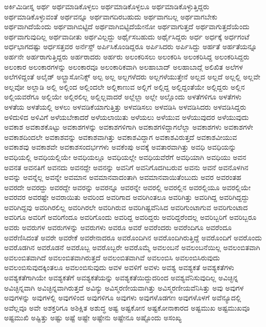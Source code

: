{ಅರ್ಕಿಮಿಡೀಸ್ನ
ಅರ್ಥ
ಅರ್ಥಮಾಡಿಕೊಳ್ಳಲು
ಅರ್ಥಮಾಡಿಕೊಳ್ಳಲೂ
ಅರ್ಥಮಾಡಿಕೊಳ್ಳುತ್ತಿದ್ದರು
ಅರ್ಥಮಾಡಿಕೊಳ್ಳುವಂತೆ
ಅರ್ಥವನ್ನೂ
ಅರ್ಥವಾಗದಿರಬಹುದು
ಅರ್ಥವಾಗಬಲ್ಲ
ಅರ್ಥವಾಗಬೇಕು
ಅರ್ಥವಾಗಿದೆಯೆಂದು
ಅರ್ಥವಾಗಿಬಿಟ್ಟಿದೆ
ಅರ್ಥವಾಗಿಬಿಟ್ಟಿದೆಯೇನೋ
ಅರ್ಥವಾಗುತ್ತದೆ
ಅರ್ಥವಾಗುತ್ತದೆಯೆಂದು
ಅರ್ಥವಾಗುವುದಿಲ್ಲ
ಅರ್ಥವಾದೀತು
ಅರ್ಥವಿಲ್ಲದ್ದು
ಅರ್ಥೈಸಬಹುದು
ಅರ್ಥೈಸಿದ್ದರು
ಅರ್ಧ
ಅರ್ಧಕ್ಕೆ
ಅರ್ಧಗಂಟೆ
ಅರ್ಧಭಾಗದಷ್ಟು
ಅರ್ಧಸತ್ತವರ
ಅರ್ನೆಸ್ಟ್
ಅರ್ಪಿಸಿಕೊಂಡಿದ್ದರೂ
ಅರ್ಪಿಸಿದರು
ಅರ್ಪಿಸಿದ್ದು
ಅರ್ಹತೆ
ಅರ್ಹತೆಯನ್ನೂ
ಅರ್ಹನೇ
ಅರ್ಹರಾಗುತ್ತಿದ್ದರು
ಅರ್ಹರಾದರು
ಅರ್ಹರು
ಅಲಂಕರಿಸಲು
ಅಲಂಕರಿಸಿ
ಅಲಂಕರಿಸಿದ್ದ
ಅಲಂಕರಿಸಿದ್ದರು
ಅಲಂಕಾರ
ಅಲಂಕಾರಗಳನ್ನು
ಅಲಂಕಾರವೂ
ಅಲಂಕಾರಿಕವಾಗಿ
ಅಲಹಾಬಾದ್
ಅಲಹಾಬಾದ್ಗೆ
ಅಲಿಖಿತ
ಅಲೆಗಳ
ಅಲೆಗಳಿದ್ದಂತೆ
ಅಲೈಡ್
ಅಲ್ಟ್ರಾಸೋನಿಕ್ಸ್
ಅಲ್ಪ
ಅಲ್ಲ
ಅಲ್ಲಗಳೆದರು
ಅಲ್ಲಗಳೆಯುತ್ತೇನೆ
ಅಲ್ಲದ
ಅಲ್ಲದೆ
ಅಲ್ಲಲ್ಲಿ
ಅಲ್ಲವೇ
ಅಲ್ಲವೋ
ಅಲ್ಲಾಡಿ
ಅಲ್ಲಿ
ಅಲ್ಲಿಂದ
ಅಲ್ಲಿಂದಲೇ
ಅಲ್ಲಿಕಾಣುವ
ಅಲ್ಲಿಗೆ
ಅಲ್ಲಿದ್ದ
ಅಲ್ಲಿದ್ದಂತೆಯೇ
ಅಲ್ಲಿದ್ದರು
ಅಲ್ಲಿನ
ಅಲ್ಲಿಯವರೆಗೂ
ಅಲ್ಲಿಯೇ
ಅಲ್ಲಿರಲಿಲ್ಲ
ಅಲ್ಲಿಲ್ಲವಾದರೆ
ಅಲ್ಲೆಲ್ಲಾ
ಅಲ್ಲೇ
ಅಲ್ಲೊಂದು
ಅಳತೆಗಳಿಗೂ
ಅಳತೆಗಳು
ಅಳತೆಯ
ಅಳತೆಯಲ್ಲಿ
ಅಳಲು
ಅಳವಡಿಕೆಯಾಗುತ್ತಿತ್ತು
ಅಳವಡಿಸಲು
ಅಳವಡಿಸಿ
ಅಳವಡಿಸಿದರು
ಅಳವಡಿಸಿದ್ದರು
ಅಳಿದುಳಿದ
ಅಳಿವಿಗೆ
ಅಳೆಯಬೇಕಾದರೆ
ಅಳೆಯಲಾಯಿತು
ಅಳೆಯಲು
ಅಳೆಯುವ
ಅಳೆಯುವುದರ
ಅಳೆಯುವುದು
ಅವಕಾಶ
ಅವಕಾಶಕೊಟ್ಟು
ಅವಕಾಶಗಳನ್ನು
ಅವಕಾಶಗಳಿಗಾಗಿ
ಅವಕಾಶಗಳಿದ್ದಾಗಲೆಲ್ಲಾ
ಅವಕಾಶಗಳು
ಅವಕಾಶಗಳೇ
ಅವಕಾಶದಿಂದಲೇ
ಅವಕಾಶವನ್ನು
ಅವಕಾಶವಾಗಿತ್ತು
ಅವಕಾಶವಿದ್ದಾಗ
ಅವಕಾಶವಿರುತ್ತದೆ
ಅವಕಾಶವೀಯುವ
ಅವಕಾಶವು
ಅವಕಾಶವೇ
ಅವಕಾಶಸಂದರ್ಭಗಳು
ಅವಕೆಂಪು
ಅವಕ್ಕೆ
ಅವತಾರವಾಗಿತ್ತು
ಅವಧಿ
ಅವಧಿಯನ್ನು
ಅವಧಿಯಲ್ಲಿ
ಅವಧಿಯಲ್ಲಿಯೇ
ಅವಧಿಯಲ್ಲೂ
ಅವಧಿಯಲ್ಲೇ
ಅವಧಿಯವೆರೆಗೆ
ಅವಧಿಯಾಗಿ
ಅವಧಿಯು
ಅವನ
ಅವನತ
ಅವನತಿಗೆ
ಅವನದು
ಅವನದ್ದೇ
ಅವನನ್ನು
ಅವನಿಗೆ
ಅವನಿಗೊದಗಿಬರುವ
ಅವನು
ಅವನೆ
ಅವನೊಳಗಿನ
ಅವನ್ನು
ಅವನ್ನೆಲ್ಲ
ಅವನ್ನೇ
ಅವಮಾನ
ಅವಮಾನವಾದಂತಾಗಿ
ಅವಮಾನವಾಯಿತೆಂಬುದು
ಅವರ
ಅವರಂತಹ
ಅವರದೇ
ಅವರದ್ದು
ಅವರದ್ದೇ
ಅವರನ್ನು
ಅವರನ್ನೂ
ಅವರನ್ನೇ
ಅವರಲ್ಲಿ
ಅವರಲ್ಲಿನ
ಅವರಲ್ಲಿಯೂ
ಅವರಲ್ಲಿಯೇ
ಅವರವರ
ಅವರಷ್ಟೇ
ಅವರಾಯಿತು
ಅವರಿಂದ
ಅವರಿಗಾದ
ಅವರಿಗಿಂತಲೂ
ಅವರಿಗಿತ್ತು
ಅವರಿಗಿದ್ದ
ಅವರಿಗಿದ್ದದ್ದು
ಅವರಿಗಿದ್ದವು
ಅವರಿಗಿರಲಿಲ್ಲ
ಅವರಿಗಿರಲೇ
ಅವರಿಗಿರುವ
ಅವರಿಗಿಷ್ಟವೆನಿಸಿದ
ಅವರಿಗುಂಟಾಗುವ
ಅವರಿಗುಂಟಾದ
ಅವರಿಗೂ
ಅವರಿಗೆ
ಅವರಿಗೆಂದೂ
ಅವರಿಗೊಂದು
ಅವರಿದ್ದ
ಅವರಿದ್ದರು
ಅವರಿದ್ದರೆಂದಲ್ಲ
ಅವರಿಬ್ಬರಿಗೆ
ಅವರಿಬ್ಬರೂ
ಅವರು
ಅವರುಗಳ
ಅವರುಗಳನ್ನು
ಅವರುಗಳು
ಅವರೂ
ಅವರೆ
ಅವರೆಂದರು
ಅವರೆಂದಿಗೂ
ಅವರೆಂದೂ
ಅವರೆಣಿಸಿದಂತೆ
ಅವರೇ
ಅವರೇಕೆ
ಅವರೇನಾದರೂ
ಅವರೊಂದಿಗಿನ
ಅವರೊಂದಿಗಿರುತ್ತಿದ್ದೆ
ಅವರೊಂದಿಗೆ
ಅವರೊಂದು
ಅವರೊಡಗಿನ
ಅವರೊಡನೆ
ಅವರೊಬ್ಬ
ಅವರೊಬ್ಬರೇ
ಅವರೊಮ್ಮೆ
ಅವಲಂಬನೆ
ಅವಲಂಬನೆಯಿಲ್ಲ
ಅವಲಂಬಿತವಾಗಿ
ಅವಲಂಬಿತವಾಗಿದೆ
ಅವಲಂಬಿತವಾಗಿರುತ್ತದೆ
ಅವಲಂಬಿತವಾಗಿವೆ
ಅವಲಂಬಿಸಿ
ಅವಲಂಬಿಸಿರುವುದು
ಅವಲಂಬಿಸುವುದಕ್ಕಿಂತಲೂ
ಅವಲಂಬಿಸುವುದು
ಅವಳ
ಅವಳಿಗೆ
ಅವಳು
ಅವಶ್ಯ
ಅವಶ್ಯಕತೆ
ಅವಶ್ಯಕತೆಗಳು
ಅವಶ್ಯಕತೆಗಾಗಿಯೇ
ಅವಶ್ಯಕತೆಗೆ
ಅವಶ್ಯಕತೆಯನ್ನು
ಅವಶ್ಯಕತೆಯಿದ್ದುದರಿಂದ
ಅವಶ್ಯವೆನಿಸುವುದಿಲ್ಲ
ಅವಿಚ್ಛಿನ್ನ
ಅವಿಚ್ಛಿನ್ನವಾಗಿ
ಅವಿಚ್ಛಿನ್ನವಾಗಿರುತ್ತದೆ
ಅವಿನ್ಯು
ಅವಿಸ್ಮರಣೀಯವಾಗಿತ್ತು
ಅವಿಸ್ಮರಣೀಯವೆನಿಸಿತ್ತು
ಅವು
ಅವುಗಳ
ಅವುಗಳನ್ನು
ಅವುಗಳಲ್ಲಿ
ಅವುಗಳಿಂದ
ಅವುಗಳಿಗೂ
ಅವುಗಳು
ಅವುಗಳೊಡಗಣ
ಅವುಗಳೊಳಗೆ
ಅವೆನ್ಯೂದಲ್ಲಿ
ಅವೆಲ್ಲವೂ
ಅವೇ
ಅಶಕ್ತರಿಗೂ
ಅಶಿಕ್ಷಿತ
ಅಶುದ್ಧ
ಅಷ್ಟ
ಅಷ್ಟಕೋನ
ಅಷ್ಟಕೋನಾಕಾರದ
ಅಷ್ಟಮುಖ
ಅಷ್ಟಮುಖವೂ
ಅಷ್ಟಮುಖಿ
ಅಷ್ಟಿತ್ತು
ಅಷ್ಟು
ಅಷ್ಟೆ
ಅಷ್ಟೇ
ಅಷ್ಟೇನು
ಅಷ್ಟೇನೂ
ಅಷ್ಟೊಂದು
ಅಸಂಖ್ಯ
}
